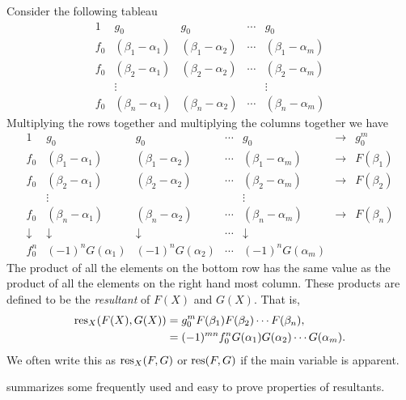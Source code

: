 Consider the following tableau
\[
\begin{matrix}
1 & g_0 & g_0 & \cdots & g_0 \\
f_0 & (\beta_1 - \alpha_1) & (\beta_1 - \alpha_2) & \cdots & (\beta_1 - \alpha_m)\\
f_0 & (\beta_2 - \alpha_1) & (\beta_2 - \alpha_2) & \cdots & (\beta_2 - \alpha_m)\\
    &     \vdots           &                      &        & \vdots \\
f_0 & (\beta_n - \alpha_1) & (\beta_n - \alpha_2) & \cdots & (\beta_n - \alpha_m)
\end{matrix}
\]
Multiplying the rows together and multiplying the columns together we have
\[
\begin{matrix}
1 & g_0 & g_0 & \cdots & g_0 & \rightarrow & g_0^m\\
f_0 & (\beta_1 - \alpha_1) & (\beta_1 - \alpha_2) & \cdots & (\beta_1 - \alpha_m)
& \rightarrow & F(\beta_1) \\
f_0 & (\beta_2 - \alpha_1) & (\beta_2 - \alpha_2) & \cdots & (\beta_2 - \alpha_m)
& \rightarrow & F(\beta_2) \\
    &     \vdots           &                      &        & \vdots \\
f_0 & (\beta_n - \alpha_1) & (\beta_n - \alpha_2) & \cdots & (\beta_n - \alpha_m)
& \rightarrow & F(\beta_n) \\
\downarrow & \downarrow & \downarrow & \cdots & \downarrow \\
f_0^n & (-1)^n G(\alpha_1) & (-1)^n G(\alpha_2) & \cdots & (-1)^n
G(\alpha_m)
\end{matrix}
\]
The product of all the elements on the bottom row has the same value
as the product of all the elements on the right hand most column.
These products are defined to be the {\em resultant} of $F(X)$ and
$G(X)$.  That is,
\begin{equation} \label{Resultant:Def:Eq}
\begin{aligned}
\mathop{\rm res}\nolimits_X(F(X), G(X)) & = g_0^m F(\beta_1) F(\beta_2) \cdots F(\beta_n), \\
& = (-1)^{mn} f_0^n G(\alpha_1) G(\alpha_2) \cdots G(\alpha_m).
\end{aligned}
\end{equation}
We often write this as $\mathop{\rm res}\nolimits_{X}(F, G)$ or $\mathop{\rm res}\nolimits(F, G)$
if the main variable is apparent.

 summarizes some frequently used and easy to
prove properties of resultants.

